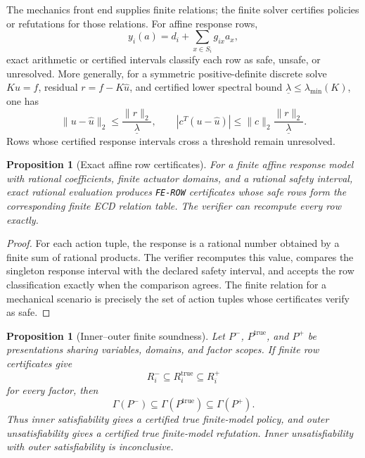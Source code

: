 \documentclass[11pt]{article}
\theoremstyle{plain}
\newtheorem{proposition}[theorem]{Proposition}
\theoremstyle{definition}
\theoremstyle{remark}
\begin{document}
The mechanics front end supplies finite relations; the finite solver certifies
policies or refutations for those relations.  For affine response rows,
\[
  y_i(a)=d_i+\sum_{x\in S_i}g_{ix}a_x,
\]
exact arithmetic or certified intervals classify each row as safe, unsafe, or
unresolved.  More generally, for a symmetric positive-definite discrete solve
\(Ku=f\), residual \(r=f-K\widehat u\), and certified lower spectral bound
\(\underline\lambda\le\lambda_{
\min}(K)\), one has
\[
  \|u-\widehat u\|_2\le \frac{\|r\|_2}{\underline\lambda},
  \qquad
  |c^T(u-\widehat u)|\le
  \|c\|_2\frac{\|r\|_2}{\underline\lambda}.
\]
Rows whose certified response intervals cross a threshold remain unresolved.

\begin{proposition}[Exact affine row certificates]
\label{prop:exact-affine-row-certificates}
For a finite affine response model with rational coefficients, finite actuator
domains, and a rational safety interval, exact rational evaluation produces
\texttt{FE-ROW} certificates whose safe rows form the corresponding finite ECD
relation table.  The verifier can recompute every row exactly.
\end{proposition}

\begin{proof}
For each action tuple, the response is a rational number obtained by a finite
sum of rational products.  The verifier recomputes this value, compares the
singleton response interval with the declared safety interval, and accepts the
row classification exactly when the comparison agrees.  The finite relation for
a mechanical scenario is precisely the set of action tuples whose certificates
verify as safe.
\end{proof}

\begin{proposition}[Inner--outer finite soundness]
\label{prop:inner-outer-soundness}
Let \(P^-\), \(P^{\mathrm{true}}\), and \(P^+\) be presentations sharing
variables, domains, and factor scopes.  If finite row certificates give
\[
  R_i^-\subseteq R_i^{\mathrm{true}}\subseteq R_i^+
\]
for every factor, then
\[
  \Gamma(P^-)\subseteq\Gamma(P^{\mathrm{true}})\subseteq\Gamma(P^+).
\]
Thus inner satisfiability gives a certified true finite-model policy, and outer
unsatisfiability gives a certified true finite-model refutation.  Inner
unsatisfiability with outer satisfiability is inconclusive.
\end{proposition}
\end{document}

